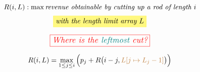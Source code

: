 \begin{frame}{}
  \[
    R(i, L): \max \text{\it revenue obtainable by cutting up a rod of length $i$}
  \]
  \[
    \hl{yellow}{\it with the length limit array $L$}
  \]

  \pause
  \vspace{0.30cm}
  \[
    \textcolor{red}{\fbox{\large \it Where is the \textcolor{teal}{leftmost} cut?}}
  \]

  \pause
  \vspace{0.50cm}
  \[
    R(i, L) = \max_{1 \le j \le i} \Big(p_j + R\big(i-j, \textcolor{brown}{L[j \mapsto L_j-1]}\big)\Big)
  \]
\end{frame}
